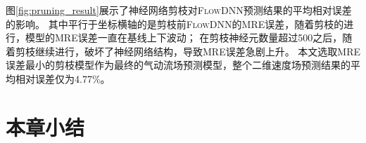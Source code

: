 图\ref{fig:pruning_result}展示了神经网络剪枝对\textsc{FlowDNN}预测结果的平均相对误差的影响。
其中平行于坐标横轴的是剪枝前\textsc{FlowDNN}的MRE误差，随着剪枝的进行，模型的MRE误差一直在基线上下波动；
在剪枝神经元数量超过500之后，随着剪枝继续进行，破坏了神经网络结构，导致MRE误差急剧上升。
本文选取MRE误差最小的剪枝模型作为最终的气动流场预测模型，整个二维速度场预测结果的平均相对误差仅为4.77\%。


\section{本章小结}

